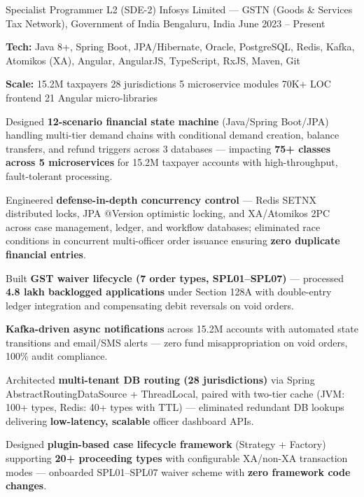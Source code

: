 \begin{cventries}
\cventry
  {Specialist Programmer L2 (SDE-2)}
  {Infosys Limited --- GSTN (Goods \& Services Tax Network), Government of India}
  {Bengaluru, India}
  {June 2023 -- Present}
  {
    \begin{cvitems}
      \item {\textbf{Tech:} Java 8+, Spring Boot, JPA/Hibernate, Oracle, PostgreSQL, Redis, Kafka, Atomikos (XA), Angular, AngularJS, TypeScript, RxJS, Maven, Git}
      \item {\textbf{Scale:} 15.2M taxpayers \textbar{} 28 jurisdictions \textbar{} 5 microservice modules \textbar{} 70K+ LOC frontend \textbar{} 21 Angular micro-libraries}
      \item {Designed \textbf{12-scenario financial state machine} (Java/Spring Boot/JPA) handling multi-tier demand chains with conditional demand creation, balance transfers, and refund triggers across 3 databases --- impacting \textbf{75+ classes across 5 microservices} for 15.2M taxpayer accounts with high-throughput, fault-tolerant processing.}
      \item {Engineered \textbf{defense-in-depth concurrency control} --- Redis SETNX distributed locks, JPA @Version optimistic locking, and XA/Atomikos 2PC across case management, ledger, and workflow databases; eliminated race conditions in concurrent multi-officer order issuance ensuring \textbf{zero duplicate financial entries}.}
      \item {Built \textbf{GST waiver lifecycle (7 order types, SPL01--SPL07)} --- processed \textbf{4.8 lakh backlogged applications} under Section 128A with double-entry ledger integration and compensating debit reversals on void orders.}
      \item {\textbf{Kafka-driven async notifications} across 15.2M accounts with automated state transitions and email/SMS alerts --- zero fund misappropriation on void orders, 100\% audit compliance.}
      \item {Architected \textbf{multi-tenant DB routing (28 jurisdictions)} via Spring AbstractRoutingDataSource + ThreadLocal, paired with two-tier cache (JVM: 100+ types, Redis: 40+ types with TTL) --- eliminated redundant DB lookups delivering \textbf{low-latency, scalable} officer dashboard APIs.}
      \item {Designed \textbf{plugin-based case lifecycle framework} (Strategy + Factory) supporting \textbf{20+ proceeding types} with configurable XA/non-XA transaction modes --- onboarded SPL01--SPL07 waiver scheme with \textbf{zero framework code changes}.}

\end{cvitems}}
\end{cventries}
